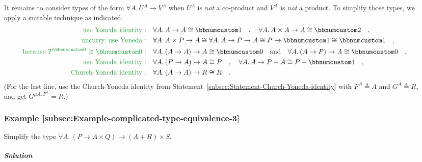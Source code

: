 It remains to consider types of the form $\forall A.\,U^{A}\rightarrow V^{A}$
when $U^{A}$ is \emph{not} a co-product and $V^{A}$ is \emph{not}
a product. To simplify those types, we apply a suitable technique
as indicated:
\begin{align*}
{\color{greenunder}\text{use Yoneda identity}:}\quad & \forall A.\,A\rightarrow A\cong\bbnum 1\quad,\quad\forall A.\,A\times A\rightarrow A\cong\bbnum 2\quad,\\
{\color{greenunder}\text{uncurry, use Yoneda}:}\quad & \forall A.\,A\times P\rightarrow A\cong\forall A.\,A\rightarrow P\rightarrow A\cong P\rightarrow\bbnum 1\cong\bbnum 1\quad,\\
{\color{greenunder}\text{because }T^{\bbnum 0}\cong\bbnum 0:}\quad & \forall A.\,(A\rightarrow A)\rightarrow A\cong\bbnum 0\quad\text{and}\quad\forall A.\,(A\rightarrow P)\rightarrow A\cong\bbnum 0\quad,\\
{\color{greenunder}\text{use Yoneda identity}:}\quad & \forall A.\,(P\rightarrow A)\rightarrow A\cong P\quad,\quad\forall A.\,A\rightarrow P+A\cong P+\bbnum 1\quad,\\
{\color{greenunder}\text{Church-Yoneda identity}:}\quad & \forall A.\,(A\rightarrow A)\rightarrow R\cong R\quad.
\end{align*}
(For the last line, use the Church-Yoneda identity from Statement~\ref{subsec:Statement-Church-Yoneda-identity}
with $F^{A}\triangleq A$ and $G^{A}\triangleq R$, and get $G^{\mu A.\,F^{A}}=R$.)

\subsubsection{Example \label{subsec:Example-complicated-type-equivalence-3}\ref{subsec:Example-complicated-type-equivalence-3}}

Simplify the type $\forall A.\,(P\rightarrow A\times Q)\rightarrow(A+R)\times S$.

\subparagraph{Solution}

